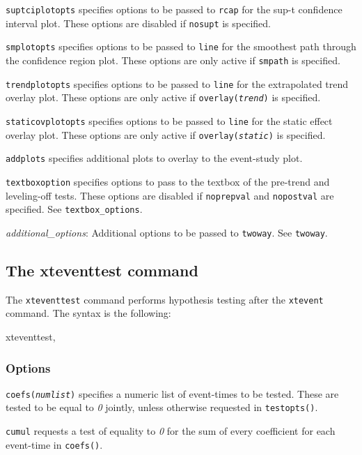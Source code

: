 \documentclass[12pt]{article}
\begin{document}
\hangpara
\texttt{suptciplotopts} specifies options to be passed to \texttt{rcap} for the sup-t confidence interval plot.
These options are disabled if \texttt{nosupt} is specified.

\hangpara
\texttt{smplotopts} specifies options to be passed to \texttt{line} for the smoothest path through the confidence region plot.
These options are only active if \texttt{smpath} is specified.

\hangpara
\texttt{trendplotopts} specifies options to be passed to \texttt{line} for the extrapolated trend overlay plot.
These options are only active if \texttt{overlay({\it trend})} is specified.

\hangpara
\texttt{staticovplotopts} specifies options to be passed to \texttt{line} for the static effect overlay plot.
These options are only active if \texttt{overlay({\it static})} is specified.

\hangpara
\texttt{addplots} specifies additional plots to overlay to the event-study plot.

\hangpara
\texttt{textboxoption} specifies options to pass to the textbox of the pre-trend and leveling-off tests.
These options are disabled if \texttt{noprepval} and \texttt{nopostval} are specified.
See \texttt{textbox\_options}.

\hangpara
{\it additional\_options}: Additional options to be passed to \texttt{twoway}.
See \texttt{twoway}.

\subsection{The xteventtest command}
The \texttt{xteventtest} command performs hypothesis testing after the \texttt{xtevent} command. The syntax is the following:

\begin{stsyntax}
	xteventtest,
\end{stsyntax}

\subsubsection{Options}
\hangpara
\texttt{coefs({\it numlist})} specifies a numeric list of event-times to be tested. These are tested to be equal to
{\it 0} jointly, unless otherwise requested in \texttt{testopts()}.

\hangpara
\texttt{cumul} requests a test of equality to {\it 0} for the sum of every coefficient for each event-time in \texttt{coefs()}.
\end{document}
